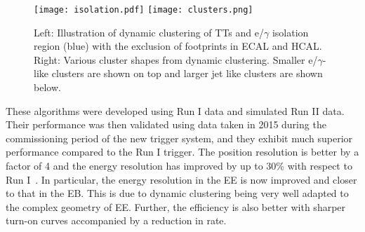 \documentclass[a4paper,11pt]{article}
\begin{document}
\begin{figure}[htbp]
\centering %
\texttt{[image: isolation.pdf]}
\qquad
\texttt{[image: clusters.png]}
\caption{\label{fig:k} Left: Illustration of dynamic clustering of TTs and e/$\gamma$ isolation region (blue) with the exclusion of footprints in ECAL and HCAL. Right: Various cluster shapes from dynamic clustering. Smaller e/$\gamma$-like clusters are shown on top and larger jet like clusters are shown below.}
\end{figure}

These algorithms were developed using Run I data and simulated Run II data. Their performance was then validated using data taken in 2015 during the commissioning period of the new trigger system, and they exhibit much superior performance compared to the Run I trigger. The position resolution is better by  a factor of 4 and the energy resolution has improved by up to 30\% with respect to Run I~\cite{h}. In particular, the energy resolution in the EE is now improved and closer to that in the EB. This is due to dynamic clustering being very well adapted to the complex geometry of EE. Further, the efficiency is also better with sharper turn-on curves accompanied by a reduction in rate.
\end{document}
